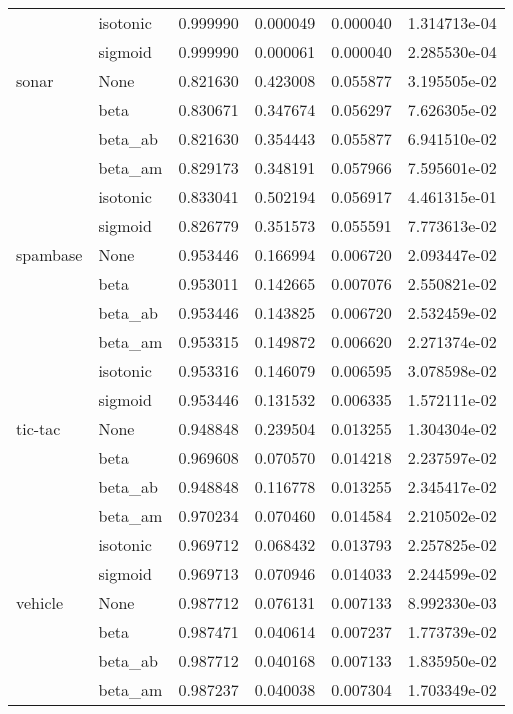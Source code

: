 \begin{tabular}{llrrrr}
        & isotonic &  0.999990 &  0.000049 &  0.000040 &  1.314713e-04 \\
        & sigmoid &  0.999990 &  0.000061 &  0.000040 &  2.285530e-04 \\
sonar & None &  0.821630 &  0.423008 &  0.055877 &  3.195505e-02 \\
        & beta &  0.830671 &  0.347674 &  0.056297 &  7.626305e-02 \\
        & beta\_ab &  0.821630 &  0.354443 &  0.055877 &  6.941510e-02 \\
        & beta\_am &  0.829173 &  0.348191 &  0.057966 &  7.595601e-02 \\
        & isotonic &  0.833041 &  0.502194 &  0.056917 &  4.461315e-01 \\
        & sigmoid &  0.826779 &  0.351573 &  0.055591 &  7.773613e-02 \\
spambase & None &  0.953446 &  0.166994 &  0.006720 &  2.093447e-02 \\
        & beta &  0.953011 &  0.142665 &  0.007076 &  2.550821e-02 \\
        & beta\_ab &  0.953446 &  0.143825 &  0.006720 &  2.532459e-02 \\
        & beta\_am &  0.953315 &  0.149872 &  0.006620 &  2.271374e-02 \\
        & isotonic &  0.953316 &  0.146079 &  0.006595 &  3.078598e-02 \\
        & sigmoid &  0.953446 &  0.131532 &  0.006335 &  1.572111e-02 \\
tic-tac & None &  0.948848 &  0.239504 &  0.013255 &  1.304304e-02 \\
        & beta &  0.969608 &  0.070570 &  0.014218 &  2.237597e-02 \\
        & beta\_ab &  0.948848 &  0.116778 &  0.013255 &  2.345417e-02 \\
        & beta\_am &  0.970234 &  0.070460 &  0.014584 &  2.210502e-02 \\
        & isotonic &  0.969712 &  0.068432 &  0.013793 &  2.257825e-02 \\
        & sigmoid &  0.969713 &  0.070946 &  0.014033 &  2.244599e-02 \\
vehicle & None &  0.987712 &  0.076131 &  0.007133 &  8.992330e-03 \\
        & beta &  0.987471 &  0.040614 &  0.007237 &  1.773739e-02 \\
        & beta\_ab &  0.987712 &  0.040168 &  0.007133 &  1.835950e-02 \\
        & beta\_am &  0.987237 &  0.040038 &  0.007304 &  1.703349e-02 \\

\end{tabular}
